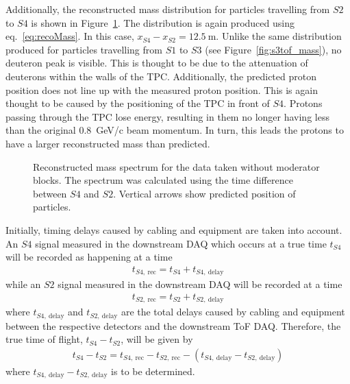 Additionally, the reconstructed mass distribution for particles travelling from $\mathit{S2}$ to $\mathit{S4}$ is shown in Figure~\ref{fig:s4tof_mass}. 
The distribution is again produced using eq.~\ref{eq:recoMass}.
In this case, $x_{\mathit{S4}}-x_{\mathit{S2}} = 12.5~\text{m}$.
Unlike the same distribution produced for particles travelling from $\mathit{S1}$ to $\mathit{S3}$ (see Figure~\ref{fig:s3tof_mass}), no deuteron peak is visible.
This is thought to be due to the attenuation of deuterons within the walls of the TPC.
Additionally, the predicted proton position does not line up with the measured proton position. 
This is again thought to be caused by the positioning of the TPC in front of $\mathit{S4}$.
Protons passing through the TPC lose energy, resulting in them no longer having less than the original 0.8~GeV/c beam momentum.
In turn, this leads the protons to have a larger reconstructed mass than predicted.

\begin{figure}[h]
  \centering
  \begin{adjustbox}{max totalsize={.8\textwidth}{.5\textheight},center}
    
  \end{adjustbox}
  \caption{Reconstructed mass spectrum for the data taken without moderator blocks. The spectrum was calculated using the time difference between $\mathit{S4}$ and $\mathit{S2}$. Vertical arrows show predicted position of particles.}
  \label{fig:s4tof_mass}
\end{figure}

Initially, timing delays caused by cabling and equipment are taken into account.
An $\mathit{S4}$ signal measured in the downstream DAQ which occurs at a true time $t_{\mathit{S4}}$ will be recorded as happening at a time
\begin{align}
  t_{\mathit{S4},~\text{rec}} = t_{\mathit{S4}} + t_{\mathit{S4},~\text{delay}}
  \label{eq:delayS4}
\end{align}
while an $\mathit{S2}$ signal measured in the downstream DAQ will be recorded at a time
\begin{align}
  t_{\mathit{S2},~\text{rec}} = t_{\mathit{S2}} + t_{\mathit{S2},~\text{delay}}
  \label{eq:delayS2}
\end{align}
where $t_{\mathit{S4},~\text{delay}}$ and $t_{\mathit{S2},~\text{delay}}$ are the total delays caused by cabling and equipment between the respective detectors and the downstream ToF DAQ.
Therefore, the true time of flight, $t_{\mathit{S4}} - t_{\mathit{S2}}$, will be given by
\begin{align}
  t_{\mathit{S4}} - t_{\mathit{S2}} = t_{\mathit{S4},~\text{rec}} - t_{\mathit{S2},~\text{rec}} - \left( t_{\mathit{S4},~\text{delay}} - t_{\mathit{S2},~\text{delay}} \right)
  \label{eq:delayTof}
\end{align}
where $t_{\mathit{S4},~\text{delay}} - t_{\mathit{S2},~\text{delay}}$ is to be determined.

